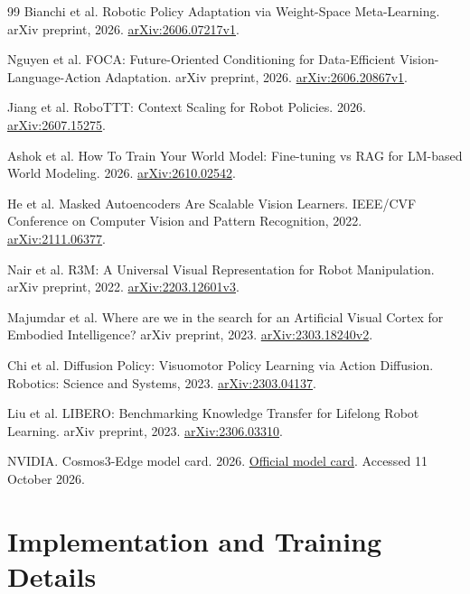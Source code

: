 \documentclass[11pt,a4paper]{article}
\begin{document}
\begin{thebibliography}{99}
Bianchi et al. Robotic Policy Adaptation via Weight-Space Meta-Learning. arXiv preprint, 2026. \href{https://arxiv.org/abs/2606.07217v1}{arXiv:2606.07217v1}.

Nguyen et al. FOCA: Future-Oriented Conditioning for Data-Efficient Vision-Language-Action Adaptation. arXiv preprint, 2026. \href{https://arxiv.org/abs/2606.20867v1}{arXiv:2606.20867v1}.

Jiang et al. RoboTTT: Context Scaling for Robot Policies. 2026. \href{https://arxiv.org/abs/2607.15275}{arXiv:2607.15275}.

Ashok et al. How To Train Your World Model: Fine-tuning vs RAG for LM-based World Modeling. 2026. \href{https://arxiv.org/abs/2610.02542}{arXiv:2610.02542}.

He et al. Masked Autoencoders Are Scalable Vision Learners. IEEE/CVF Conference on Computer Vision and Pattern Recognition, 2022. \href{https://arxiv.org/abs/2111.06377}{arXiv:2111.06377}.

Nair et al. R3M: A Universal Visual Representation for Robot Manipulation. arXiv preprint, 2022. \href{https://arxiv.org/abs/2203.12601v3}{arXiv:2203.12601v3}.

Majumdar et al. Where are we in the search for an Artificial Visual Cortex for Embodied Intelligence? arXiv preprint, 2023. \href{https://arxiv.org/abs/2303.18240v2}{arXiv:2303.18240v2}.

Chi et al. Diffusion Policy: Visuomotor Policy Learning via Action Diffusion. Robotics: Science and Systems, 2023. \href{https://arxiv.org/abs/2303.04137}{arXiv:2303.04137}.

Liu et al. LIBERO: Benchmarking Knowledge Transfer for Lifelong Robot Learning. arXiv preprint, 2023. \href{https://arxiv.org/abs/2306.03310}{arXiv:2306.03310}.

NVIDIA. Cosmos3-Edge model card. 2026. \href{https://huggingface.co/nvidia/Cosmos3-Edge}{Official model card}. Accessed 11 October 2026.

\end{thebibliography}

\appendix

\section{Implementation and Training Details}

\end{document}
